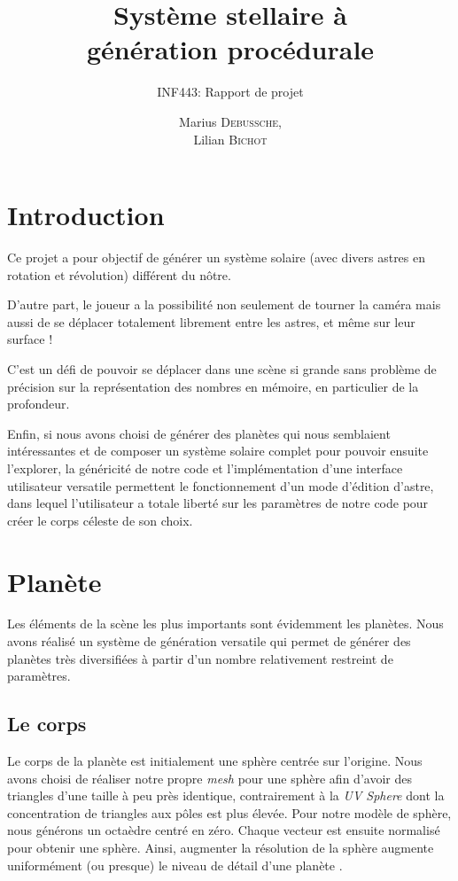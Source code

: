 \documentclass[a4paper,12pt,twoside]{article}
\title{Système stellaire à\\génération procédurale}
\subtitle{INF443: Rapport de projet}
\author{Marius \textsc{Debussche},\\Lilian \textsc{Bichot}}
\begin{document}
\maketitle
\tableofcontents
\newpage

\section{Introduction}

Ce projet a pour objectif de générer un système solaire (avec divers astres en rotation et révolution) différent du nôtre.

D'autre part, le joueur a la possibilité non seulement de tourner la caméra mais aussi de se déplacer totalement librement entre les astres, et même sur leur surface !

C'est un défi de pouvoir se déplacer dans une scène si grande sans problème de précision sur la représentation des nombres en mémoire, en particulier de la profondeur.

Enfin, si nous avons choisi de générer des planètes qui nous semblaient intéressantes et de composer un système solaire complet pour pouvoir ensuite l'explorer, la généricité de notre code et l'implémentation d'une interface utilisateur versatile permettent le fonctionnement d'un mode d'édition d'astre, dans lequel l'utilisateur a totale liberté sur les paramètres de notre code pour créer le corps céleste de son choix.



\section{Planète}

Les éléments de la scène les plus importants sont évidemment les planètes. Nous avons réalisé un système de génération versatile qui permet de générer des planètes très diversifiées à partir d'un nombre relativement restreint de paramètres.

\subsection{Le corps}

Le corps de la planète est initialement une sphère centrée sur l'origine. Nous avons choisi de réaliser notre propre \textit{mesh} pour une sphère afin d'avoir des triangles d'une taille à peu près identique, contrairement à la \textit{UV Sphere} dont la concentration de triangles aux pôles est plus élevée. 
Pour notre modèle de sphère, nous générons un octaèdre centré en zéro. Chaque vecteur est ensuite normalisé pour obtenir une sphère. Ainsi, augmenter la résolution de la sphère augmente uniformément (ou presque) le niveau de détail d'une planète \cite{spheremesh}.
\end{document}
